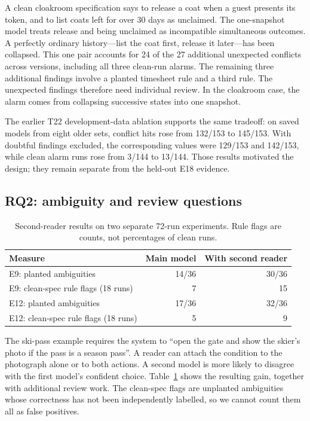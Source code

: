 A clean cloakroom specification says to release a coat when a guest presents
its token, and to list coats left for over 30 days as unclaimed. The one-snapshot
model treats release and being unclaimed as incompatible simultaneous outcomes.
A perfectly ordinary history---list the coat first, release it later---has been
collapsed. This one pair accounts for 24 of the 27 additional unexpected
conflicts across versions, including all three clean-run alarms. The remaining
three additional findings involve a planted timesheet rule and a third rule.
The unexpected findings therefore need individual review. In the cloakroom
case, the alarm comes from collapsing successive states into one snapshot.

The earlier T22 development-data ablation supports the same tradeoff: on saved
models from eight older sets, conflict hits rose from 132/153 to 145/153.
With doubtful findings excluded, the corresponding values were 129/153 and
142/153, while clean alarm runs rose from 3/144 to 13/144. Those results
motivated the design; they remain separate from the held-out E18 evidence.

\subsection{RQ2: ambiguity and review questions}\label{sec:rq2}

\begin{table}[H]
\centering
\small
\begin{tabular}{@{}lrr@{}}
\toprule
Measure & Main model & With second reader \\
\midrule
E9: planted ambiguities & 14/36 & 30/36 \\
E9: clean-spec rule flags (18 runs) & 7 & 15 \\
E12: planted ambiguities & 17/36 & 32/36 \\
E12: clean-spec rule flags (18 runs) & 5 & 9 \\
\bottomrule
\end{tabular}
\caption{Second-reader results on two separate 72-run experiments. Rule flags
are counts, not percentages of clean runs.}
\label{tab:second-reader-evaluation}
\end{table}

The ski-pass example requires the system to ``open the gate and show the
skier's photo if the pass is a season pass''. A reader can attach the condition
to the photograph alone or to both actions. A second model is more likely to
disagree with the first model's confident choice. Table~\ref{tab:second-reader-evaluation}
shows the resulting gain, together with additional review work. The clean-spec
flags are unplanted ambiguities whose correctness has not been independently
labelled, so we cannot count them all as false positives.

